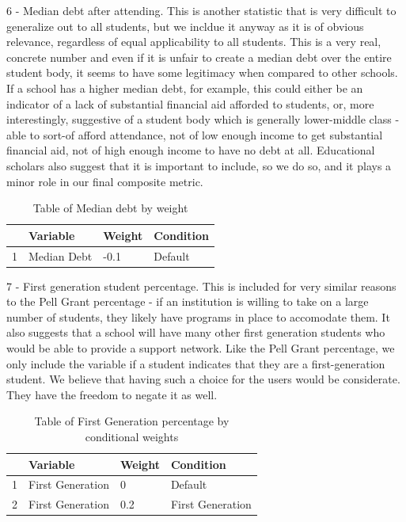 \documentclass{article}\usepackage[]{graphicx}\usepackage[]{color}
\begin{document}
6 - Median debt after attending. This is another statistic that is very difficult to generalize out to all students, but we incldue it anyway as it is of obvious relevance, regardless of equal applicability to all students. This is a very real, concrete number and even if it is unfair to create a median debt over the entire student body, it seems to have some legitimacy when compared to other schools. If a school has a higher median debt, for example, this could either be an indicator of a lack of substantial financial aid afforded to students, or, more interestingly, suggestive of a student body which is generally lower-middle class - able to sort-of afford attendance, not of low enough income to get substantial financial aid, not of high enough income to have no debt at all. Educational scholars also suggest that it is important to include, so we do so, and it plays a minor role in our final composite metric.

\begin{table}[ht]
\centering
\begin{tabular}{rlll}
  \hline
 & Variable & Weight & Condition \\ 
  \hline
1 & Median Debt & -0.1 & Default \\ 
   \hline
\end{tabular}
\caption{Table of Median debt by weight} 
\end{table}


7 - First generation student percentage. This is included for very similar reasons to the Pell Grant percentage - if an institution is willing to take on a large number of students, they likely have programs in place to accomodate them. It also suggests that a school will have many other first generation students who would be able to provide a support network. Like the Pell Grant percentage, we only include the variable if a student indicates that they are a first-generation student. We believe that having such a choice for the users would be considerate. They have the freedom to negate it as well.

\begin{table}[ht]
\centering
\begin{tabular}{rlll}
  \hline
 & Variable & Weight & Condition \\ 
  \hline
1 & First Generation & 0 & Default \\ 
  2 & First Generation & 0.2 & First Generation \\ 
   \hline
\end{tabular}
\caption{Table of First Generation percentage by conditional weights} 
\end{table}
\end{document}
